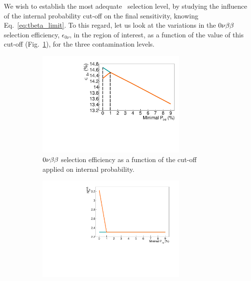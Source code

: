 We wish to establish the most adequate \Pint\ selection level, by studying the influence of the internal probability cut-off on the final sensitivity, knowing Eq.~\eqref{eq:tbeta_limit}.
To this regard, let us look at the variations in the $0\nu\beta\beta$ selection efficiency, $\epsilon_{0\nu}$, in the region of interest, as a function of the value of this cut-off (Fig.~\ref{subfig:cont_Pint_eff}), for the three contamination levels.
\begin{figure}[!h]
\centering
\begin{subfigure}[t]{0.7\textwidth}
  \centering
  \includegraphics[width=0.82\textwidth]{Sensitivity/fig_sensitivity/cont_cut_eff_B.pdf}
  \captionsetup{justification=justified}
  \caption{$0\nu\beta\beta$ selection efficiency as a function of the cut-off applied on internal probability.
    \label{subfig:cont_Pint_eff}}
\end{subfigure}
\hfill
\begin{subfigure}[t]{0.7\textwidth}
  \centering
  \includegraphics[width=0.82\textwidth]{Sensitivity/fig_sensitivity/cont_cut_Nexp_B.pdf}
  \captionsetup{justification=justified}

\end{subfigure}
\end{figure}
